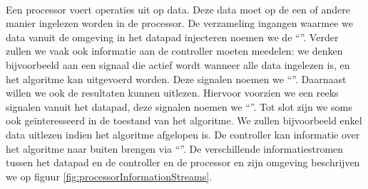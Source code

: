 \paragraph{}
Een processor voert operaties uit op data. Deze data moet op de een of andere manier ingelezen worden in de processor. De verzameling ingangen waarmee we data vanuit de omgeving in het datapad injecteren noemen we de ``''. Verder zullen we vaak ook informatie aan de controller moeten meedelen: we denken bijvoorbeeld aan een signaal die actief wordt wanneer alle data ingelezen is, en het algoritme kan uitgevoerd worden. Deze signalen noemen we ``''. Daarnaast willen we ook de resultaten kunnen uitlezen. Hiervoor voorzien we een reeks signalen vanuit het datapad, deze signalen noemen we ``''. Tot slot zijn we soms ook ge\"interesseerd in de toestand van het algoritme. We zullen bijvoorbeeld enkel data uitlezen indien het algoritme afgelopen is. De controller kan informatie over het algoritme naar buiten brengen via ``''. De verschillende informatiestromen tussen het datapad en de controller en de processor en zijn omgeving beschrijven we op figuur \ref{fig:processorInformationStreams}.
